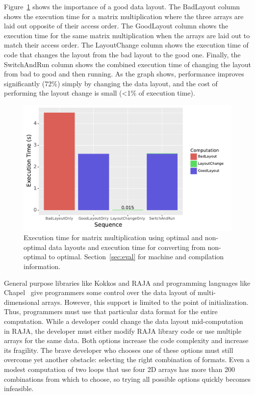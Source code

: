 \documentclass[sigconf,review=true]{acmart}
\begin{document}
Figure~\ref{IntroExample} shows the importance of a good data layout. 
The BadLayout column shows the execution time for a matrix multiplication where the three arrays are laid out opposite of their access order. 
The GoodLayout column shows the execution time for the same matrix multiplication when the arrays are laid out to match their access order.
The LayoutChange column shows the execution time of code that changes the layout from the bad layout to the good one.
Finally, the SwitchAndRun column shows the combined execution time of changing the layout from bad to good and then running.
As the graph shows, performance improves  significantly (72\%) simply by changing the data layout, and the cost of performing the layout change is small (<1\% of execution time). 

\begin{figure}
	\includegraphics[width=\columnwidth]{IntroExampleGraph.pdf}
	\caption{Execution time for matrix multiplication using optimal and non-optimal data layouts and execution time for converting from non-optimal to optimal. Section~\ref{sec:eval} for machine and compilation information.}
	\label{IntroExample}
\end{figure}

General purpose libraries like Kokkos and RAJA and programming languages like Chapel~\cite{diaconescu2007approach} give programmers some control over the data layout of multi-dimensional arrays. However, this support is limited to the point of initialization.
Thus, programmers must use that particular data format for the entire computation.
While a developer could change the data layout mid-computation in RAJA, the developer must either modify RAJA library code or use multiple arrays for the same data. 
Both options increase the code complexity and increase its fragility.
The brave developer who chooses one of these options must still overcome yet another obstacle: selecting the right combination of formats.
Even a modest computation of two loops that use four 2D arrays has more than 200 combinations from which to choose, so trying all possible options quickly becomes infeasible. 
\end{document}
